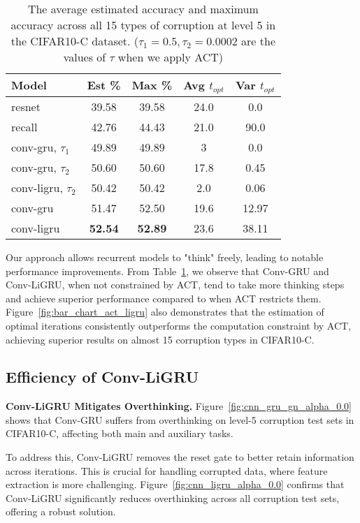 \begin{table}[t!]
\setlength{\tabcolsep}{3.5pt} 
\centering
\caption{The average estimated accuracy and maximum accuracy across all 15 types of corruption at level 5 in the CIFAR10-C dataset. ($\tau_1 = 0.5, \tau_2=0.0002$ are the values of $\tau$ when we apply ACT)}
\begin{tabular}{l|cc|cc}
\hline
\textbf{Model} & \textbf{Est \%} & \textbf{Max \%} & \textbf{Avg $t_{opt}$} & \textbf{Var $t_{opt}$} \\ \hline
resnet & 39.58 & 39.58 & 24.0 & 0.0 \\
recall & 42.76 & 44.43 & 21.0 & 90.0 \\
conv-gru, $\tau_1$ & 49.89 & 49.89 & 3 & 0.0 \\
conv-gru, $\tau_2$ & 50.60 & 50.60 & 17.8 & 0.45 \\
conv-ligru, $\tau_2$ & 50.42 & 50.42 & 2.0 & 0.06 \\
conv-gru & 51.47  & 52.50 & 19.6 & 12.97 \\
conv-ligru & \textbf{52.54} & \textbf{52.89} & 23.6 & 38.11 \\ \hline
\end{tabular}
\label{tab:acc_gap}
\end{table}

Our approach allows recurrent models to "think" freely, leading to notable performance improvements. 
From Table~\ref{tab:acc_gap}, we observe that Conv-GRU and Conv-LiGRU, when not constrained by ACT, tend to take more thinking steps and achieve superior performance compared to when ACT restricts them. Figure~\ref{fig:bar_chart_act_ligru} also demonstrates that the estimation of optimal iterations consistently outperforms the computation constraint by ACT, achieving superior results on almost 15 corruption types in CIFAR10-C.

\subsection{Efficiency of Conv-LiGRU}
\textbf{Conv-LiGRU Mitigates Overthinking.} 
Figure~\ref{fig:cnn_gru_gn_alpha_0.0} shows that Conv-GRU suffers from overthinking on level-5 corruption test sets in CIFAR10-C, affecting both main and auxiliary tasks.

To address this, Conv-LiGRU removes the reset gate to better retain information across iterations. 
This is crucial for handling corrupted data, where feature extraction is more challenging. 
Figure~\ref{fig:cnn_ligru_alpha_0.0} confirms that Conv-LiGRU significantly reduces overthinking across all corruption test sets, offering a robust solution.

